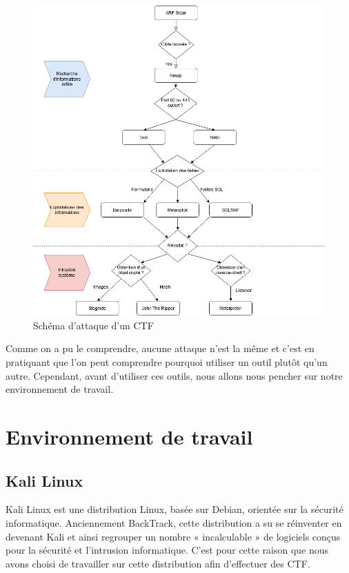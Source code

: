 \begin{figure}[htp!]
  \centering
  \setlength\figureheight{7cm}
  \setlength\figurewidth{9cm}
  \includegraphics[width=1\textwidth]{oui/images/Chapitre1/Attackdiag.png}
  \caption{Schéma d'attaque d'un CTF}
  \label{fig:schema-ctf}
\end{figure}

Comme on a pu le comprendre, aucune attaque n'est la même et c'est en pratiquant que l'on peut comprendre pourquoi utiliser un outil plutôt qu'un autre. Cependant, avant d'utiliser ces outils, nous allons nous pencher sur notre environnement de travail.

\section{Environnement de travail}

\subsection{Kali Linux}

Kali Linux est une distribution Linux, basée sur Debian, orientée sur la sécurité informatique. Anciennement BackTrack, cette distribution a su se réinventer en devenant Kali et ainsi regrouper un nombre « incalculable » de logiciels conçus pour la sécurité et l’intrusion informatique. C’est pour cette raison que nous avons choisi de travailler sur cette distribution afin d'effectuer des CTF.

